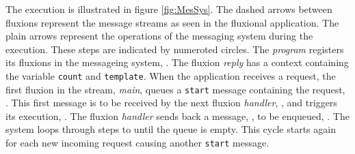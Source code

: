 
The execution is illustrated in figure \ref{fig:MesSys}.
The dashed arrows between fluxions represent the message streams as seen in the fluxional application.
The plain arrows represent the operations of the messaging system during the execution.
These steps are indicated by numeroted circles.
The \textit{program} registers its fluxions in the messageing system, .
The fluxion \textit{reply} has a context containing the variable \texttt{count} and \texttt{tem\-plate}.
When the application receives a request, the first fluxion in the stream, \textit{main}, queues a \texttt{start} message containing the request, .
This first message is to be received by the next fluxion \textit{handler}, , and triggers its execution, .
The fluxion \textit{handler} sends back a message, , to be enqueued, .
The system loops through steps  to  until the queue is empty.
This cycle starts again for each new incoming request causing another \texttt{start} message.

\begin{figure}[h!]%
\end{figure}

